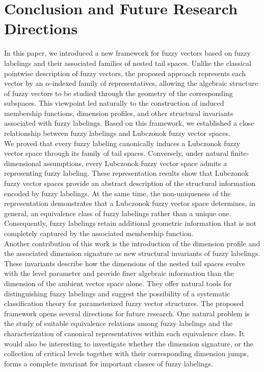 \documentclass[preprint,12pt]{elsarticle}
\theoremstyle{definition}
\begin{document}
\section{Conclusion and Future Research Directions}
In this paper, we introduced a new framework for fuzzy vectors based on fuzzy labelings and their associated families of nested tail spaces. Unlike the classical pointwise description of fuzzy vectors, the proposed approach represents each vector by an $\alpha$-indexed family of representatives, allowing the algebraic structure of fuzzy vectors to be studied through the geometry of the corresponding subspaces. This viewpoint led naturally to the construction of induced membership functions, dimension profiles, and other structural invariants associated with fuzzy labelings.
Based on this framework, we established a close relationship between fuzzy labelings and Lubczonok fuzzy vector spaces.\\ We proved that every fuzzy labeling canonically induces a Lubczonok fuzzy vector space through its family of tail spaces. Conversely, under natural finite-dimensional assumptions, every Lubczonok fuzzy vector space admits a representing fuzzy labeling. These representation results show that Lubczonok fuzzy vector spaces provide an abstract description of the structural information encoded by fuzzy labelings. At the same time, the non-uniqueness of the representation demonstrates that a Lubczonok fuzzy vector space determines, in general, an equivalence class of fuzzy labelings rather than a unique one. Consequently, fuzzy labelings retain additional geometric information that is not completely captured by the associated membership function.\\
Another contribution of this work is the introduction of the dimension profile and the associated dimension signature as new structural invariants of fuzzy labelings. These invariants describe how the dimensions of the nested tail spaces evolve with the level parameter and provide finer algebraic information than the dimension of the ambient vector space alone. They offer natural tools for distinguishing fuzzy labelings and suggest the possibility of a systematic classification theory for parameterized fuzzy vector structures.
The proposed framework opens several directions for future research. One natural problem is the study of suitable equivalence relations among fuzzy labelings and the characterization of canonical representatives within each equivalence class. It would also be interesting to investigate whether the dimension signature, or the collection of critical levels together with their corresponding dimension jumps, forms a complete invariant for important classes of fuzzy labelings.\\
\end{document}

